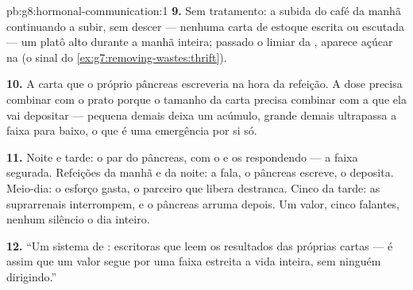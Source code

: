 \begin{solution}{pb:g8:hormonal-communication:1}
\textbf{9.} Sem tratamento: a subida do café da manhã continuando a
subir, sem descer --- nenhuma carta de estoque escrita ou escutada ---
um platô alto durante a manhã inteira; passado o limiar da
, aparece açúcar na  (o sinal do
\cref{ex:g7:removing-wastes:thrift}).

\textbf{10.} A carta que o próprio pâncreas escreveria na hora da
refeição. A dose precisa combinar com o prato porque o tamanho da
carta precisa combinar com a  que ela vai depositar --- pequena
demais deixa um acúmulo, grande demais ultrapassa a faixa para baixo,
o que é uma emergência por si só.

\textbf{11.} Noite e tarde: o par do pâncreas, com o  e os
 respondendo --- a faixa segurada. Refeições da manhã e da
noite: a  fala, o pâncreas escreve, o  deposita.
Meio-dia: o esforço gasta, o parceiro que libera destranca. Cinco da
tarde: as suprarrenais interrompem, e o pâncreas arruma depois. Um
valor, cinco falantes, nenhum silêncio o dia inteiro.

\textbf{12.} ``Um sistema de : escritoras que leem os
resultados das próprias cartas --- é assim que um valor segue por uma
faixa estreita a vida inteira, sem ninguém dirigindo.''
\end{solution}
